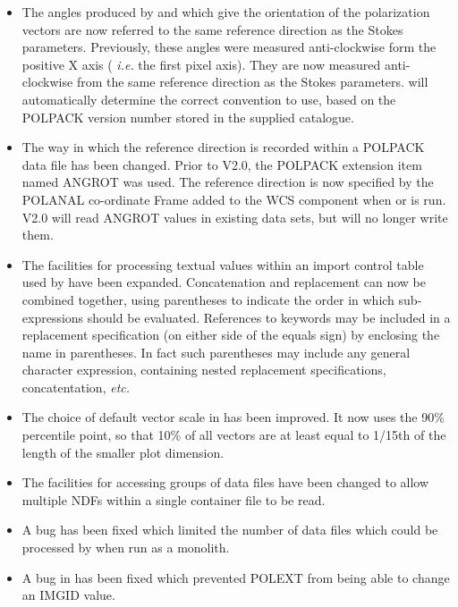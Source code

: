 \documentclass[twoside,11pt]{starlink}
\begin{document}
\begin{itemize}
\item The angles produced by  and
 which
give the orientation of the polarization vectors are now referred to the
same reference direction as the Stokes parameters. Previously, these
angles were measured anti-clockwise form the positive X axis (\emph{
i.e.} the first pixel axis). They are now measured anti-clockwise from
the same reference direction as the Stokes parameters.
will automatically determine the correct convention to use, based on the
POLPACK version number stored in the supplied catalogue.

\item The way in which the reference direction is recorded within a
POLPACK data file has been changed. Prior to V2.0, the POLPACK extension
item named ANGROT was used. The reference direction is now specified by
the POLANAL co-ordinate Frame added to the WCS component when
 or  is run. V2.0 will read
ANGROT values in existing data sets, but will no longer write them.

\item The facilities for processing textual values within an import
control table used by  have been expanded.
Concatenation and replacement can now be combined together, using
parentheses to indicate the order in which sub-expressions should be
evaluated. References to keywords may be included in a replacement
specification (on either side of the equals sign) by enclosing the name
in parentheses. In fact such parentheses may include any general
character expression, containing nested replacement specifications,
concatentation, \emph{etc.}

\item The choice of default vector scale in 
has been improved. It now uses the 90\% percentile point, so that 10\% of
all vectors are at least equal to 1/15th of the length of the smaller plot
dimension.

\item The facilities for accessing groups of data files have been changed
to allow multiple NDFs within a single container file to be read.

\item A bug has been fixed which limited the number of data files which
could be processed by  when run as a monolith.

\item A bug in  has been fixed which prevented
POLEXT from being able to change an IMGID value.


\end{itemize}
\end{document}
